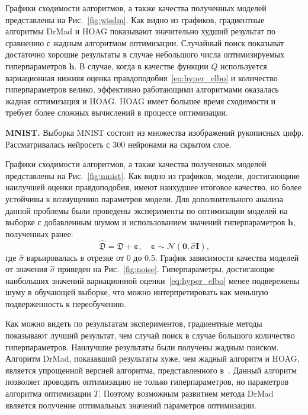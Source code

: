 Графики сходимости алгоритмов, а также качества полученных моделей представлены на Рис.~\ref{fig:wisdm}.
Как видно из графиков, градиентные алгоритмы DrMad и HOAG показывают значительно худший результат по сравнению с жадным алгоритмом оптимизации. Случайный поиск показыват достаточно хорошие результаты в случае небольшого числа оптимизируемых гиперпараметров $\mathbf{h}$. В случае, когда в качестве функции $Q$ используется вариационная нижняя оценка правдоподобия~\eqref{eq:hyper_elbo} и количество гиперпараметров велико, эффективно работающими алгоритмами оказалась жадная оптимизация и HOAG. HOAG имеет большее время сходимости и требует более сложных вычислений в процессе оптимизации.


\textbf{MNIST. }
Выборка MNIST состоит из множества изображений рукописных цифр.
Рассматривалась нейросеть с 300 нейронами на скрытом слое.

Графики сходимости алгоритмов, а также качества полученных моделей представлены на Рис.~\ref{fig:mnist}.
Как видно из графиков, модели, достигающиие наилучшей оценки правдоподобия, имеют наихудшее итоговое качество, но более устойчивы к возмущению параметров модели. Для дополнительного анализа данной проблемы были проведены эксперименты по оптимизации моделей на выборке с добавленным шумом и использованием значений гиперпараметров $\mathbf{h}$, полученных ранее:
\[
    \hat{\mathfrak{D}} = \mathfrak{D} + \boldsymbol{\varepsilon}, \quad   \boldsymbol{\varepsilon} \sim \mathcal{N}(\mathbf{0}, \hat{\sigma}\mathbf{I}),
\]
где $\hat{\sigma}$ варьировалась в отрезке от 0 до 0.5.
График зависимости качества моделей от значения $\hat{\sigma}$ приведен на Рис.~\ref{fig:noise}.  Гиперпараметры, достигающие наибольших значений вариационной оценки~\eqref{eq:hyper_elbo} менее подвережены шуму в обучающей выборке, что можно интерпретировать как меньшую подверженность к переобучению.

Как можно видеть по результатам экспериментов, градиентные методы показывают лучший результат, чем случай поиск в случае большого количество гиперпараметров. Наилучшие результаты были получены жадным поиском. Алгоритм DrMad, показавший результаты хуже, чем жадный алгоритм и HOAG, является упрощенной версией алгоритма, представленного в~\cite{hyper_mad}. Данный алгоритм позволяет проводить оптимизацию не только гиперпараметров, но параметров алгоритма оптимизации $T$. Поэтому возможным развитием  метода DrMad является получение оптимальных значений параметров оптимизации.


